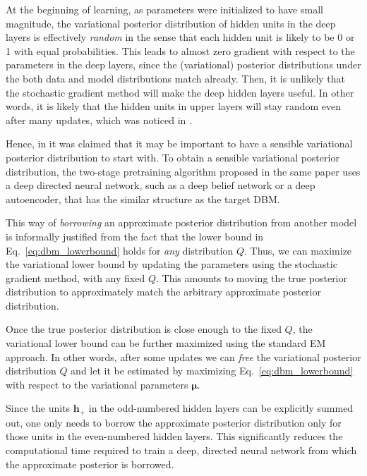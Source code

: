 \documentclass[dissertation,nocontribution]{aaltoseries}
\newcommand{\vect}[1]{\mathbf{#1}}
\newcommand{\vects}[1]{\boldsymbol{#1}}
\newcommand{\vh}[0]{\vect{h}}
\newcommand{\vmu}[0]{\vects{\mu}}
\begin{document}
At the beginning of learning, as parameters were initialized
to have small magnitude, the variational posterior
distribution of hidden units in the deep layers is
effectively \textit{random} in the sense that each hidden unit
is likely to be 0 or 1 with equal probabilities. This leads
to almost zero gradient with respect to the parameters in
the deep layers, since the (variational) posterior
distributions under the both data and model distributions
match already. Then, it is unlikely that the stochastic
gradient method will make the deep hidden layers useful. In
other words, it is likely that the hidden units in upper
layers will stay random even after many updates, which was
noticed in .

Hence, in  it was claimed that it may
be important to have a sensible variational posterior
distribution to start with. To obtain a sensible variational
posterior distribution, the two-stage pretraining algorithm
proposed in the same paper uses a deep directed
neural network, such as a deep belief network or a deep
autoencoder, that has the similar structure as the target
DBM.

This way of \textit{borrowing} an approximate posterior
distribution from another model is informally justified from
the fact that the lower bound in
Eq.~\eqref{eq:dbm_lowerbound} holds for \textit{any}
distribution $Q$. Thus, we can maximize the variational
lower bound by updating the parameters using the stochastic
gradient method, with any fixed $Q$. This amounts to moving
the true posterior distribution to approximately match the
arbitrary approximate posterior distribution.

Once the true posterior distribution is close enough to the
fixed $Q$, the variational lower bound can be further
maximized using the standard EM approach. In other words,
after some updates we can \textit{free} the variational
posterior distribution $Q$ and let it be estimated by
maximizing Eq.~\eqref{eq:dbm_lowerbound} with respect to the
variational parameters $\vmu$.

Since the units $\vh_+$
in the odd-numbered hidden layers can be explicitly summed
out, one only needs to borrow the approximate
posterior distribution only for those units in the
even-numbered hidden layers. This significantly reduces the
computational time required to train a deep, directed neural
network from which the approximate posterior is borrowed.
\end{document}
